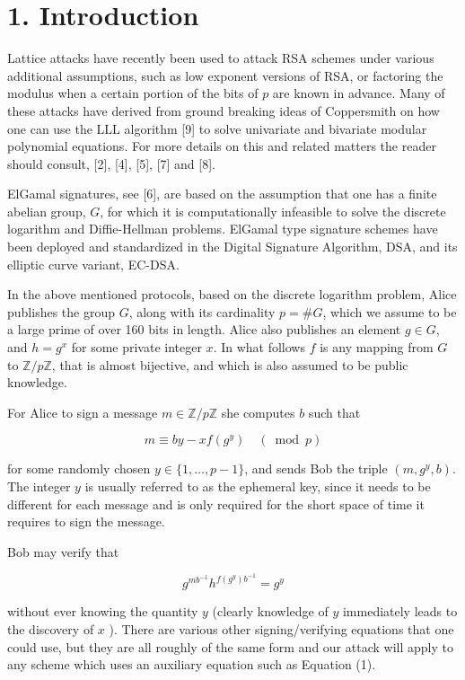 \documentclass[10pt]{article}
\begin{document}
\section*{1. Introduction}
Lattice attacks have recently been used to attack RSA schemes under various additional assumptions, such as low exponent versions of RSA, or factoring the modulus when a certain portion of the bits of $p$ are known in advance. Many of these attacks have derived from ground breaking ideas of Coppersmith on how one can use the LLL algorithm [9] to solve univariate and bivariate modular polynomial equations. For more details on this and related matters the reader should consult, [2], [4], [5], [7] and [8].

ElGamal signatures, see [6], are based on the assumption that one has a finite abelian group, $G$, for which it is computationally infeasible to solve the discrete logarithm and Diffie-Hellman problems. ElGamal type signature schemes have been deployed and standardized in the Digital Signature Algorithm, DSA, and its elliptic curve variant, EC-DSA.

In the above mentioned protocols, based on the discrete logarithm problem, Alice publishes the group $G$, along with its cardinality $p=\# G$, which we assume to be a large prime of over 160 bits in length. Alice also publishes an element $g \in G$, and $h=g^{x}$ for some private integer $x$. In what follows $f$ is any mapping from $G$ to $\mathbb{Z} / p \mathbb{Z}$, that is almost bijective, and which is also assumed to be public knowledge.

For Alice to sign a message $m \in \mathbb{Z} / p \mathbb{Z}$ she computes $b$ such that


\begin{equation*}
m \equiv b y-x f\left(g^{y}\right) \quad(\bmod p) \tag{1}
\end{equation*}


for some randomly chosen $y \in\{1, \ldots, p-1\}$, and sends Bob the triple $\left(m, g^{y}, b\right)$. The integer $y$ is usually referred to as the ephemeral key, since it needs to be different for each message and is only required for the short space of time it requires to sign the message.

Bob may verify that

$$
g^{m b^{-1}} h^{f\left(g^{y}\right) b^{-1}}=g^{y}
$$

without ever knowing the quantity $y$ (clearly knowledge of $y$ immediately leads to the discovery of $x$ ). There are various other signing/verifying equations that one could use, but they are all roughly of the same form and our attack will apply to any scheme which uses an auxiliary equation such as Equation (1).
\end{document}
